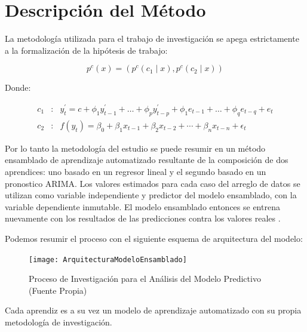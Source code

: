 \section{Descripción del Método}
La metodología utilizada para el trabajo de investigación se apega estrictamente a la formalización de la hipótesis de trabajo:

\begin{equation}
    p^{c}(x) = (p^{c}(c_{1} \mid x),p^{c}(c_{2} \mid x))
\end{equation}

Donde:

\begin{eqnarray}
    c_{1} & : & y_{t}^{\prime} = c + \phi_{1}y_{t-1}^{\prime} + \ldots + \phi_{p}y_{t-p}^{\prime} + \phi_{1}e_{t-1} + \ldots + \phi_{q}e_{t-q} + e_{t} \\
    c_{2} & : & f(y_{t}) = \beta_{0} + \beta_{1}x_{t-1} + \beta_{2}x_{t-2} + \cdots + \beta_{n}x_{t-n} + \epsilon_{t}
\end{eqnarray}

Por lo tanto la metodología del estudio se puede resumir en un método ensamblado de aprendizaje automatizado resultante de la composición de dos aprendices: uno basado en un regresor lineal y el segundo basado en un pronostico ARIMA. Los valores estimados para cada caso del arreglo de datos se utilizan como variable independiente y predictor del modelo ensamblado, con la variable dependiente inmutable. El modelo ensamblado entonces se entrena nuevamente con los resultados de las predicciones contra los valores reales \cite{leek}.

Podemos resumir el proceso con el siguiente esquema de arquitectura del modelo:

\begin{figure}[h!]
    \centering
    \texttt{[image: ArquitecturaModeloEnsamblado]}
    \caption{Proceso de Investigación para el Análisis del Modelo Predictivo (Fuente Propia)}
\end{figure}

Cada aprendiz es a su vez un modelo de aprendizaje automatizado con su propia metodología de investigación.

